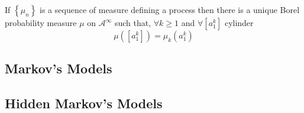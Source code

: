 \begin{theorem}
    If $\left\{\mu_n\right\}$ is a sequence of measure defining a process then there is a unique Borel probability measure $\mu$ on $\mathcal{A}^\infty$ such that, $\forall k \geq 1$ and $\forall \left[a_1^k\right]$ cylinder
    \begin{equation*}
        \mu\left(\left[a_1^k\right]\right) = \mu_k\left(a_1^k\right)
    \end{equation*}
\end{theorem}

\subsection{Markov's Models}

\subsection{Hidden Markov's Models}